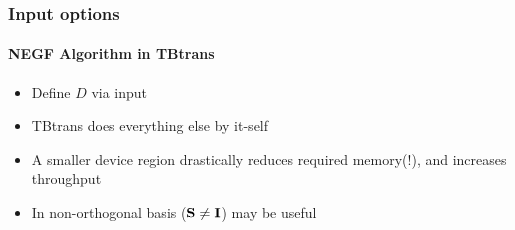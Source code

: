\begin{frame}
  \frametitle{Input options}
  \framesubtitle{NEGF Algorithm in TBtrans}

  \begin{itemize}[<+->]
    \item Define $D$ via input
    
    
    \item TBtrans does everything else by it-self
    \item A smaller device region drastically reduces required memory(!), and increases
    throughput

    \item In non-orthogonal basis ($\mathbf{S}\neq \mathbf I$)  may
    be useful

  \end{itemize}

  
\end{frame}

